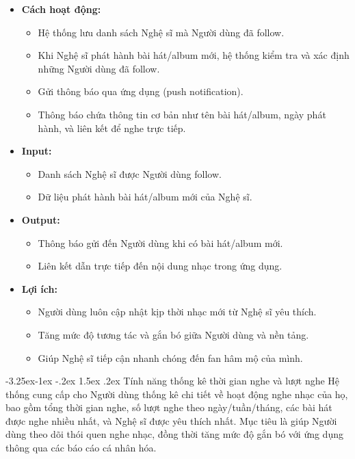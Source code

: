 \documentclass[a4paper]{article}
\makeatletter
\newcommand{\cach}{\hspace*{1.5em}\ignorespaces}
\newcounter {subsubsubsection}[subsubsection]
\newcommand\subsubsubsection{\@startsection{subsubsubsection}{4}{\z@}%
                                     {-3.25ex\@plus -1ex \@minus -.2ex}%
                                     {1.5ex \@plus .2ex}%
                                     {\normalfont\normalsize\bfseries}}
\makeatother
\begin{document}
\begin{itemize}
	\item \textbf{Cách hoạt động:}
	      \begin{itemize}
		      \item Hệ thống lưu danh sách Nghệ sĩ mà Người dùng đã follow.
		      \item Khi Nghệ sĩ phát hành bài hát/album mới, hệ thống kiểm tra và xác định những Người dùng đã follow.
		      \item Gửi thông báo qua ứng dụng (push notification).
		      \item Thông báo chứa thông tin cơ bản như tên bài hát/album, ngày phát hành, và liên kết để nghe trực tiếp.
	      \end{itemize}

	\item \textbf{Input:}
	      \begin{itemize}
		      \item Danh sách Nghệ sĩ được Người dùng follow.
		      \item Dữ liệu phát hành bài hát/album mới của Nghệ sĩ.
	      \end{itemize}

	\item \textbf{Output:}
	      \begin{itemize}
		      \item Thông báo gửi đến Người dùng khi có bài hát/album mới.
		      \item Liên kết dẫn trực tiếp đến nội dung nhạc trong ứng dụng.
	      \end{itemize}

	\item \textbf{Lợi ích:}
	      \begin{itemize}
		      \item Người dùng luôn cập nhật kịp thời nhạc mới từ Nghệ sĩ yêu thích.
		      \item Tăng mức độ tương tác và gắn bó giữa Người dùng và nền tảng.
		      \item Giúp Nghệ sĩ tiếp cận nhanh chóng đến fan hâm mộ của mình.
	      \end{itemize}
\end{itemize}
\subsubsubsection{Tính năng thống kê thời gian nghe và lượt nghe}
\cach Hệ thống cung cấp cho Người dùng thống kê chi tiết về hoạt động nghe nhạc của họ, bao gồm tổng thời gian nghe, số lượt nghe theo ngày/tuần/tháng, các bài hát được nghe nhiều nhất, và Nghệ sĩ được yêu thích nhất.
Mục tiêu là giúp Người dùng theo dõi thói quen nghe nhạc, đồng thời tăng mức độ gắn bó với ứng dụng thông qua các báo cáo cá nhân hóa.
\end{document}
